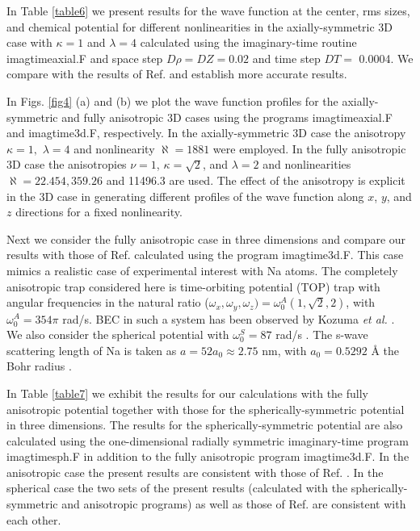\documentclass[onecolumn]{elsart3p}
\begin{document}
In Table \ref{table6} we present results for the wave function at the
center, rms sizes, and chemical potential for different nonlinearities
in the axially-symmetric 3D  case with $\kappa=1$ and $\lambda =4 $  calculated using
the imaginary-time routine
imagtimeaxial.F and  space step $D\rho=DZ=0.02$ and time step $DT=$ 0.0004. We
compare with the results of Ref. \cite{Bao_Tang} and establish more
accurate
results.


In Figs. \ref{fig4} (a) and (b) we plot the wave function profiles for
the axially-symmetric and fully anisotropic 3D cases using the programs
imagtimeaxial.F  and  imagtime3d.F, respectively.
In the axially-symmetric 3D case the anisotropy $\kappa=1,$ $\lambda =4$ and
nonlinearity $\aleph %
=1881$ were employed.
In the  fully anisotropic 3D case the anisotropies  $\nu=1$,  $\kappa
=\sqrt 2$, and
$\lambda =2$ and nonlinearities $ \aleph %
=22.454, 359.26$  and 
11496.3 are used. The effect of the anisotropy
is
explicit in the 3D case in generating different profiles of the
wave function along $x$, $y$, and $z$ directions for a fixed
nonlinearity.



Next we consider  the fully anisotropic case
in three dimensions and compare our results with those of Ref.
\cite{Schneider_Feder} calculated using the program imagtime3d.F. This
case mimics a realistic case of
experimental
interest with Na atoms. The completely anisotropic trap considered here
is time-orbiting potential (TOP) trap with angular frequencies in the
natural ratio  ($\omega_x,\omega_y,\omega_z)=\omega_0^A(1,\sqrt
2,2)$, with $\omega_0^A=354\pi $ rad/s. BEC in such a system has been
observed by Kozuma {\it et al.} \cite{kozuma}. We also consider
the
spherical potential with $\omega_0^S=87$ rad/s \cite{hau}. The s-wave
scattering
length of Na is taken as $a=52a_0\approx 2.75$ nm, with $a_0= 0.5292$
\AA \-  the Bohr
radius
\cite{Schneider_Feder}.

In Table \ref{table7} we exhibit the results for our calculations with
the fully anisotropic potential  together with those for the
spherically-symmetric potential in three dimensions. The results for the
spherically-symmetric potential are also calculated using the
one-dimensional
radially symmetric imaginary-time program imagtimesph.F
in addition to the fully
anisotropic program imagtime3d.F.  In the anisotropic case the
present results are consistent with those of Ref.
\cite{Schneider_Feder}.
In the spherical case the two sets of the present results (calculated
with
the  spherically-symmetric and anisotropic programs) as well as those of
Ref. \cite{Schneider_Feder} are consistent with each other.
\end{document}
